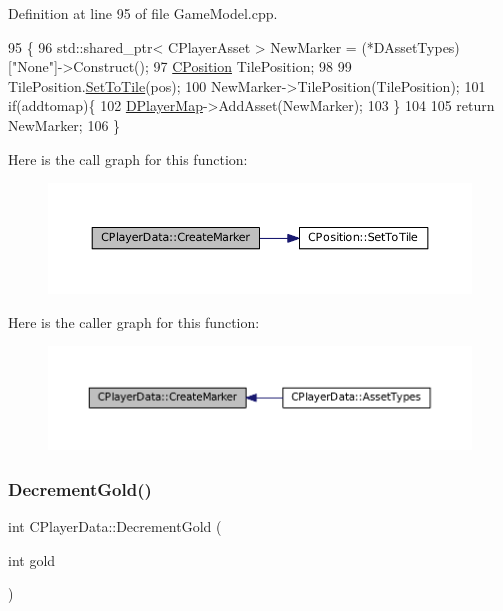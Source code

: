 Definition at line 95 of file Game\+Model.\+cpp.


\begin{DoxyCode}
95                                                                                           \{
96     std::shared\_ptr< CPlayerAsset > NewMarker = (*DAssetTypes)[\textcolor{stringliteral}{"None"}]->Construct();
97     \hyperlink{classCPosition}{CPosition} TilePosition;
98     
99     TilePosition.\hyperlink{classCPosition_ae302aa21792de64c97de29e2cbbfeb94}{SetToTile}(pos);
100     NewMarker->TilePosition(TilePosition);
101     \textcolor{keywordflow}{if}(addtomap)\{
102         \hyperlink{classCPlayerData_a452163191cd4603e1e38dd8d4bb9691c}{DPlayerMap}->AddAsset(NewMarker);
103     \}
104     
105     \textcolor{keywordflow}{return} NewMarker;
106 \}
\end{DoxyCode}
Here is the call graph for this function\+:
\nopagebreak
\begin{figure}[H]
\begin{center}
\leavevmode
\includegraphics[width=350pt]{classCPlayerData_a4ef7c98c3b0f28354a2bccc2782b57ad_cgraph}
\end{center}
\end{figure}
Here is the caller graph for this function\+:
\nopagebreak
\begin{figure}[H]
\begin{center}
\leavevmode
\includegraphics[width=350pt]{classCPlayerData_a4ef7c98c3b0f28354a2bccc2782b57ad_icgraph}
\end{center}
\end{figure}
\hypertarget{classCPlayerData_ac072cd77c60b35920a278aaffcefd3fd}{}\label{classCPlayerData_ac072cd77c60b35920a278aaffcefd3fd} 
\subsubsection{\texorpdfstring{Decrement\+Gold()}{DecrementGold()}}
{\footnotesize\ttfamily int C\+Player\+Data\+::\+Decrement\+Gold (\begin{DoxyParamCaption}\item[{int}]{gold }\end{DoxyParamCaption})\hspace{0.3cm}{\ttfamily [inline]}}



